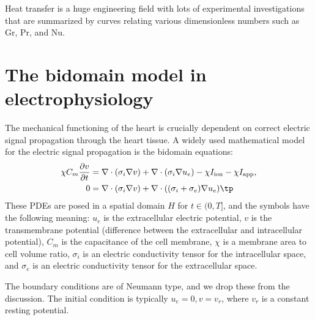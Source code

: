 \documentclass[graybox,envcountchap,sectrefs,final]{svmonodo}
\begin{document}
Heat transfer is a huge engineering
field with lots of experimental investigations
that are summarized by curves relating various dimensionless numbers
such as Gr, Pr, and Nu.

\section{The bidomain model in electrophysiology}
\label{scale:bidomain}

The mechanical functioning of the heart is crucially dependent on
correct electric signal propagation through the heart tissue.
A widely used mathematical
model for the electric signal propagation is the bidomain equations:
\begin{align}
\chi C_m\frac{\partial v}{\partial t} &=
\nabla\cdot( \sigma_i\nabla v) + \nabla\cdot (\sigma_i\nabla u_e) - \chi I_{\rm{ion}}
- \chi I_{\rm{app}},
\label{scale:bidomain:eqv}\\ 
0 &= \nabla\cdot( \sigma_i\nabla v) + \nabla\cdot ((\sigma_i + \sigma_e)\nabla u_e)\tp
\label{scale:bidomain:equ_e}
\end{align}
These PDEs are posed in a spatial domain $H$ for $t\in (0, T]$, and the symbols have the following meaning:
$u_e$ is the extracellular electric potential,
$v$ is the transmembrane potential (difference between the extracellular
and intracellular potential),
$C_m$ is the capacitance of the cell membrane,
$\chi$ is a membrane area to cell volume ratio,
$\sigma_i$ is an electric conductivity tensor for the intracellular space, and
$\sigma_e$ is an electric conductivity tensor for the extracellular space.

The boundary conditions are of Neumann type, and we drop these from the discussion.
The initial condition is typically $u_e=0, v = v_r$, where
$v_{r}$ is a constant resting potential.
\end{document}
